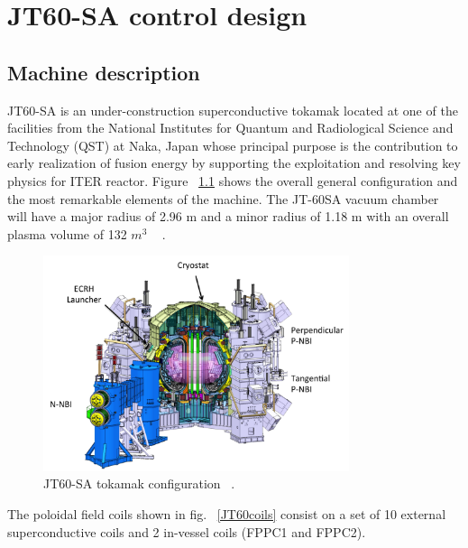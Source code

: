 \chapter{JT60-SA control design}

\section{Machine description}

JT60-SA is an under-construction superconductive tokamak located at one of the facilities from the National Institutes for Quantum and Radiological Science and Technology (QST)  at  Naka, Japan whose principal purpose is  the contribution to early realization of fusion energy by supporting the exploitation and resolving key physics for ITER reactor. Figure ~\ref{JT60schm} shows the overall general configuration and the most remarkable elements of the machine. The JT-60SA  vacuum chamber will have a major radius of 2.96 m and a minor radius of 1.18 m with an overall plasma volume of 132 $m^3$ ~\cite{Spears2014} .
\smallskip
\begin{figure}
	\centering
	\includegraphics[width=0.80\textwidth]{Chp3/JT60SA.png}
	
	\caption{\label{JT60schm}JT60-SA tokamak configuration ~\cite{JT60SA:ResearchPlan}.}
\end{figure}



The poloidal field coils shown in fig. ~\ref{JT60coils} consist on a set of 10 external superconductive coils and 2 in-vessel coils (FPPC1 and FPPC2). 


